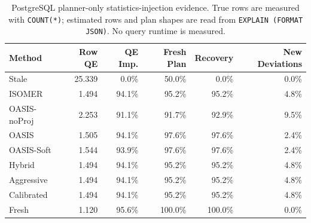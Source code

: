 \begin{table}[t]
  \centering
  \small
  \caption{PostgreSQL planner-only statistics-injection evidence. True rows are measured with \texttt{COUNT(*)}; estimated rows and plan shapes are read from \texttt{EXPLAIN (FORMAT JSON)}. No query runtime is measured.}
  \label{tab:postgres_planner_stats_injection}
  \setlength{\tabcolsep}{4pt}
  \begin{tabular}{lrrrrr}
    \toprule
    Method & Row QE & QE Imp. & Fresh Plan & Recovery & New Deviations \\
    \midrule
    Stale & 25.339 & 0.0\% & 50.0\% & 0.0\% & 0.0\% \\
    ISOMER & 1.494 & 94.1\% & 95.2\% & 95.2\% & 4.8\% \\
    OASIS-noProj & 2.253 & 91.1\% & 91.7\% & 92.9\% & 9.5\% \\
    OASIS & 1.505 & 94.1\% & 97.6\% & 97.6\% & 2.4\% \\
    OASIS-Soft & 1.544 & 93.9\% & 97.6\% & 97.6\% & 2.4\% \\
    Hybrid & 1.494 & 94.1\% & 95.2\% & 95.2\% & 4.8\% \\
    Aggressive & 1.494 & 94.1\% & 95.2\% & 95.2\% & 4.8\% \\
    Calibrated & 1.494 & 94.1\% & 95.2\% & 95.2\% & 4.8\% \\
    Fresh & 1.120 & 95.6\% & 100.0\% & 100.0\% & 0.0\% \\
    \bottomrule
  \end{tabular}
\end{table}
